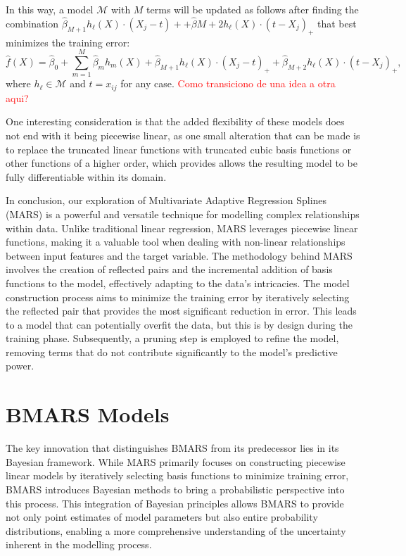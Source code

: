In this way, a model $\mathcal{M}$ with $M$ terms will be updated as follows after finding the combination $\hat \beta_{M+1} h_\ell(X) \cdot (X_j - t)+ + \hat \beta{M+2} h_\ell(X) \cdot (t-X_j)_+$ that best minimizes the training error:
$$
\hat f(X) = \hat \beta_0 + \sum_{m=1}^M \hat \beta_m h_m(X) + \hat \beta_{M+1} h_\ell(X) \cdot (X_j - t)_+ + \hat \beta_{M+2} h_\ell(X) \cdot (t-X_j)_+,
$$
where $h_\ell \in \mathcal{M}$ and $t = x_{ij}$ for any case. \textcolor{red}{Como transiciono de una idea a otra aqui?}

One interesting consideration is that the added flexibility of these models does not end with it being piecewise linear, as one small alteration that can be made is to replace the truncated linear functions with truncated cubic basis functions or other functions of a higher order, which provides allows the resulting model to be fully differentiable within its domain. 

In conclusion, our exploration of Multivariate Adaptive Regression Splines (MARS) is a powerful and versatile technique for modelling complex relationships within data. Unlike traditional linear regression, MARS leverages piecewise linear functions, making it a valuable tool when dealing with non-linear relationships between input features and the target variable. The methodology behind MARS involves the creation of reflected pairs and the incremental addition of basis functions to the model, effectively adapting to the data's intricacies. The model construction process aims to minimize the training error by iteratively selecting the reflected pair that provides the most significant reduction in error. This leads to a model that can potentially overfit the data, but this is by design during the training phase. Subsequently, a pruning step is employed to refine the model, removing terms that do not contribute significantly to the model's predictive power.

\section{BMARS Models}

The key innovation that distinguishes BMARS from its predecessor lies in its Bayesian framework. While MARS primarily focuses on constructing piecewise linear models by iteratively selecting basis functions to minimize training error, BMARS introduces Bayesian methods to bring a probabilistic perspective into this process. This integration of Bayesian principles allows BMARS to provide not only point estimates of model parameters but also entire probability distributions, enabling a more comprehensive understanding of the uncertainty inherent in the modelling process.


